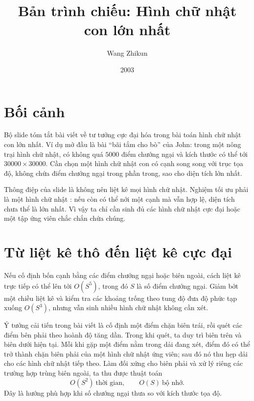 \documentclass[11pt]{article}
\title{Bản trình chiếu: Hình chữ nhật con lớn nhất}
\author{Wang Zhikun}
\date{2003}
\begin{document}
\maketitle


\section{Bối cảnh}

Bộ slide tóm tắt bài viết về tư tưởng cực đại hóa trong bài toán hình chữ
nhật con lớn nhất. Ví dụ mở đầu là bài ``bãi tắm cho bò'' của John: trong một
nông trại hình chữ nhật, có không quá \(5000\) điểm chướng ngại và kích thước
có thể tới \(30000\times30000\). Cần chọn một hình chữ nhật con có cạnh song
song với trục tọa độ, không chứa điểm chướng ngại trong phần trong, sao cho
diện tích lớn nhất.

Thông điệp của slide là không nên liệt kê mọi hình chữ nhật. Nghiệm tối ưu
phải là một hình chữ nhật : nếu còn có thể nới một cạnh mà vẫn
hợp lệ, diện tích chưa thể là lớn nhất. Vì vậy ta chỉ cần sinh đủ các hình
chữ nhật cực đại hoặc một tập ứng viên chắc chắn chứa chúng.

\section{Từ liệt kê thô đến liệt kê cực đại}

Nếu cố định bốn cạnh bằng các điểm chướng ngại hoặc biên ngoài, cách liệt kê
trực tiếp có thể lên tới \(O(S^5)\), trong đó \(S\) là số điểm chướng ngại.
Giảm bớt một chiều liệt kê và kiểm tra các khoảng trống theo tung độ đưa độ
phức tạp xuống \(O(S^3)\), nhưng vẫn sinh nhiều hình chữ nhật không cần xét.

Ý tưởng cải tiến trong bài viết là cố định một điểm chặn biên trái, rồi quét
các điểm bên phải theo hoành độ tăng dần. Trong khi quét, ta duy trì biên
trên và biên dưới hiện tại. Mỗi khi gặp một điểm nằm trong dải đang xét, điểm
đó có thể trở thành chặn biên phải của một hình chữ nhật ứng viên; sau đó nó
thu hẹp dải cho các hình chữ nhật tiếp theo. Làm đối xứng cho biên phải và
xử lý riêng các trường hợp trùng biên ngoài, ta thu được thuật toán
\[
  O(S^2)\ \text{thời gian},\qquad O(S)\ \text{bộ nhớ}.
\]
Đây là hướng phù hợp khi số chướng ngại thưa so với kích thước tọa độ.
\end{document}
